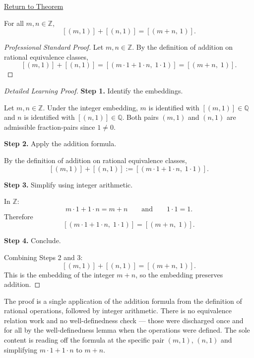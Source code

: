 \newpage
{}
\label{prf:ec-integer-embedding-add}

\begin{remark*}[Return]
\hyperref[thm:ec-integer-embedding-add]{Return to Theorem}
\end{remark*}

\begin{theorem*}
For all $m,n\in\mathbb{Z}$,
\[
[(m,1)] + [(n,1)] = [(m+n,\,1)].
\]
\end{theorem*}

\begin{proof}[Professional Standard Proof]
\LRAProofBodyStart
Let $m,n\in\mathbb{Z}$.  By the definition of addition on rational
equivalence classes,
\[
[(m,1)] + [(n,1)]
= [(m\cdot 1 + 1\cdot n,\; 1\cdot 1)]
= [(m+n,\; 1)].
\]
\end{proof}

\begin{proof}[Detailed Learning Proof]
\LRAProofBodyStart

\textbf{Step 1.} Identify the embeddings.

Let $m,n\in\mathbb{Z}$.  Under the integer embedding, $m$ is identified
with $[(m,1)]\in\mathbb{Q}$ and $n$ is identified with $[(n,1)]\in\mathbb{Q}$.
Both pairs $(m,1)$ and $(n,1)$ are admissible fraction-pairs since $1\neq 0$.

\textbf{Step 2.} Apply the addition formula.

By the definition of addition on rational equivalence classes,
\[
[(m,1)] + [(n,1)]
:= [(m\cdot 1 + 1\cdot n,\; 1\cdot 1)].
\]

\textbf{Step 3.} Simplify using integer arithmetic.

In $\mathbb{Z}$:
\[
m\cdot 1 + 1\cdot n = m + n
\qquad\text{and}\qquad
1\cdot 1 = 1.
\]
Therefore
\[
[(m\cdot 1 + 1\cdot n,\; 1\cdot 1)] = [(m+n,\; 1)].
\]

\textbf{Step 4.} Conclude.

Combining Steps 2 and 3:
\[
[(m,1)] + [(n,1)] = [(m+n,\,1)].
\]
This is the embedding of the integer $m+n$, so the embedding preserves
addition.
\end{proof}

\begin{remark*}
The proof is a single application of the addition formula from the definition
of rational operations, followed by integer arithmetic.  There is no
equivalence relation work and no well-definedness check --- those were
discharged once and for all by the well-definedness lemma when the
operations were defined.  The sole content is reading off the formula at
the specific pair $(m,1)$, $(n,1)$ and simplifying $m\cdot 1 + 1\cdot n$
to $m+n$.
\end{remark*}

